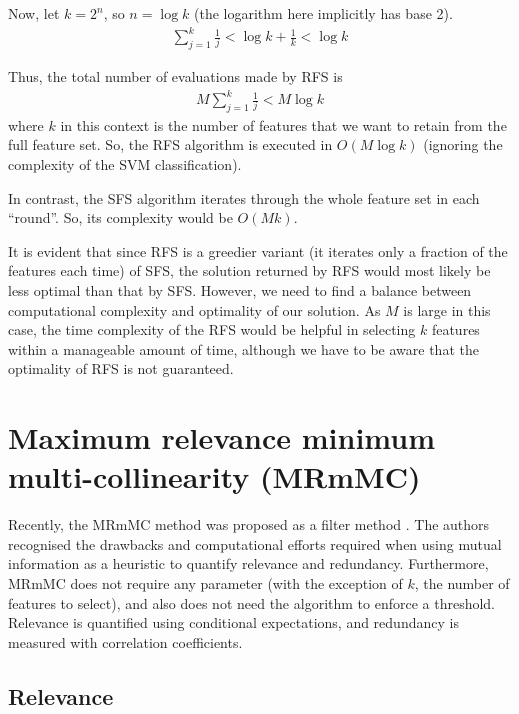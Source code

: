 \documentclass[12pt, twoside, a4paper]{report}
\begin{document}
Now, let $k=2^n$, so $n=\log k$ (the logarithm here implicitly has base 2).
\begin{align*}
\sum_{j=1}^k \frac{1}{j} < \log k+ \frac{1}{k} < \log k
\end{align*}

Thus, the total number of evaluations made by RFS is
\begin{align*}
M \sum_{j=1}^k \frac{1}{j} < M \log k
\end{align*}
where $k$ in this context is the number of features that we want to retain from the full feature set. So, the RFS algorithm is executed in $O(M\log k)$ (ignoring the complexity of the SVM classification).

In contrast, the SFS algorithm iterates through the whole feature set in each ``round''. So, its complexity would be $O(Mk)$.

It is evident that since RFS is a greedier variant (it iterates only a fraction of the features each time) of SFS, the solution returned by RFS would most likely be less optimal than that by SFS. However, we need to find a balance between computational complexity and optimality of our solution. As $M$ is large in this case, the time complexity of the RFS would be helpful in selecting $k$ features within a manageable amount of time, although we have to be aware that the optimality of RFS is not guaranteed.


\section{Maximum relevance minimum multi-collinearity (MRmMC)} \label{mrmmc}

Recently, the MRmMC method was proposed as a filter method \cite{RefWorks:187}. The authors recognised the drawbacks and computational efforts required when using mutual information as a heuristic to quantify relevance and redundancy. Furthermore, MRmMC does not require any parameter (with the exception of $k$, the number of features to select), and also does not need the algorithm to enforce a threshold. Relevance is quantified using conditional expectations, and redundancy is measured with correlation coefficients.

\subsection{Relevance}
\end{document}

